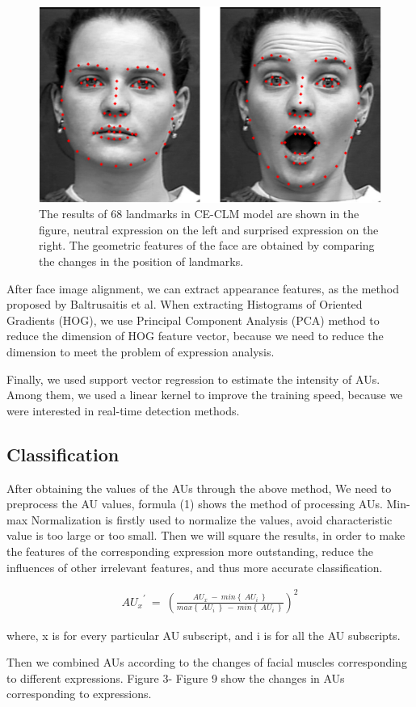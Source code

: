\documentclass[10pt, conference, compsocconf]{IEEEtran}
\begin{document}
\begin{figure}[h]
	\centering
	\includegraphics[width=\linewidth]{CECLM}
	\caption{The results of 68 landmarks in CE-CLM model are shown in the figure, neutral expression on the left and surprised expression on the right. The geometric features of the face are obtained by comparing the changes in the position of landmarks.}
\end{figure}

After face image alignment, we can extract appearance features, as the method proposed by Baltrusaitis\cite{Baltrusaitis2015Cross} et al. When extracting Histograms of Oriented Gradients (HOG), we use Principal Component Analysis (PCA) method to reduce the dimension of HOG feature vector, because we need to reduce the dimension to meet the problem of expression analysis.

Finally, we used support vector regression to estimate the intensity of AUs. Among them, we used a linear kernel to improve the training speed, because we were interested in real-time detection methods.

\subsection{Classification}
\par After obtaining the values of the AUs through the above method, We need to preprocess the AU values, formula (1) shows the method of processing AUs. Min-max Normalization is firstly used to normalize the values, avoid characteristic value is too large or too small. Then we will square the results, in order to make the features of the corresponding expression more outstanding, reduce the influences of other irrelevant features, and thus more accurate classification.

\begin{equation}\label{eqn:1}
\begin{split}
\displaystyle {AU_x}^{'} \ =\ \left(  \frac{AU_x\ -\ min\left\{\ AU_i\ \right\}} {max\left\{\ AU_i\ \right\}\ -\ min\left\{\ AU_i\ \right\}}\right)^2
\end{split}
\end{equation}
\par where, x is for every particular AU subscript, and i is for all the AU subscripts.
\par Then we combined AUs according to the changes of facial muscles corresponding to different expressions. Figure 3- Figure 9 show the changes in AUs corresponding to expressions.
\end{document}

